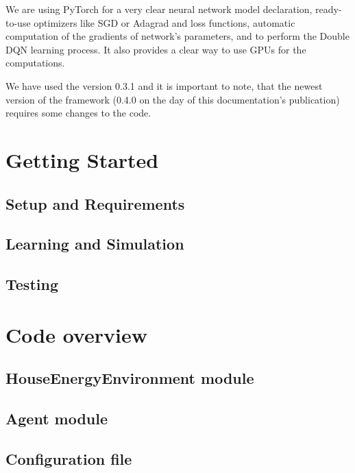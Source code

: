 \documentclass{article}
\begin{document}
We are using PyTorch for a very clear neural network model declaration, ready-to-use optimizers like SGD or Adagrad and loss functions, automatic computation of the gradients of network's parameters, and to perform the Double DQN learning process. It also provides a clear way to use GPUs for the computations. 

We have used the version 0.3.1 and it is important to note, that the newest version of the framework (0.4.0 on the day of this documentation's publication) requires some changes to the code.
\section{Getting Started}
\subsection{Setup and Requirements}
\subsection{Learning and Simulation}
\subsection{Testing}
\section{Code overview}
\subsection{HouseEnergyEnvironment module}

\subsection{Agent module}

\subsection{Configuration file}
\end{document}
